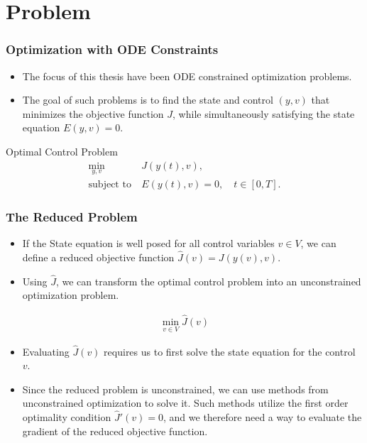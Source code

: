 \documentclass[9pt]{beamer}
\begin{document}
\section{Problem}
\begin{frame}
\frametitle{Optimization with ODE Constraints}
\begin{itemize}
\item{The focus of this thesis have been ODE constrained optimization problems.}
\item{The goal of such problems is to find the state and control $(y,v)$ that minimizes the objective function $J$, while simultaneously satisfying the state equation $E(y,v)=0$.}
\end{itemize}
\begin{block}{Optimal Control Problem}
\begin{align*}
\min_{y,v} &J(y(t),v), \\
\textrm{subject to} \ &E(y(t),v)=0,\quad t\in[0,T].
\end{align*}
\end{block}
\end{frame}
\begin{frame}
\frametitle{The Reduced Problem}
\begin{itemize}
\item{If the State equation is well posed for all control variables $v\in V$, we can define a reduced objective function $\hat{J}(v) = J(y(v),v)$.}
\item{Using $\hat J$, we can transform the optimal control problem into an unconstrained optimization problem.}
\end{itemize}
\begin{align*}
\min_{v\in V}\hat J (v)
\end{align*}
\begin{itemize}
\item{Evaluating $\hat J(v)$ requires us to first solve the state equation for the control $v$.}
\item{Since the reduced problem is unconstrained, we can use methods from unconstrained optimization to solve it. Such methods utilize the first order optimality condition $\hat J'(v)=0$, and we therefore need a way to evaluate the gradient of the reduced objective function.}
\end{itemize}
\end{frame}
\end{document}
